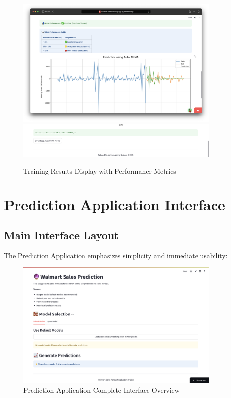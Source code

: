 \begin{figure}[H]
    \centering
    \includegraphics[width=0.9\textwidth]{Images/04GUIAndUserInterface/TrainingResults.png}
   \includegraphics[width=0.9\textwidth]{Images/04GUIAndUserInterface/TrainedModelDownload.png}
     \caption{Training Results Display with Performance Metrics}
    \label{fig:training_results}
\end{figure}

\section{Prediction Application Interface}

\subsection{Main Interface Layout}

The Prediction Application emphasizes simplicity and immediate usability:

\begin{figure}[H]
    \centering
    \includegraphics[width=0.9\textwidth]{Images/04GUIAndUserInterface/PredictionAppOverview.png}
    \caption{Prediction Application Complete Interface Overview}
    \label{fig:prediction_app_overview}
\end{figure}

